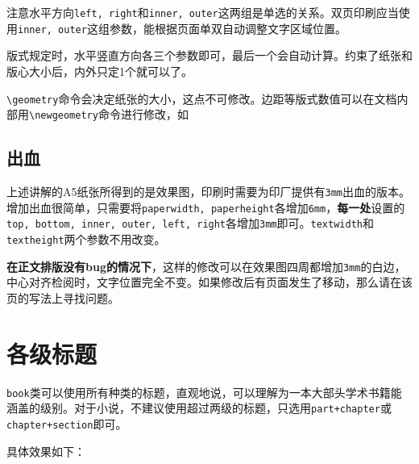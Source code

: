 \documentclass[10pt,openany]{book}
\begin{document}
注意水平方向\texttt{left,\ right}和\texttt{inner,\ outer}这两组是单选的关系。双页印刷应当使用\texttt{inner,\ outer}这组参数，能根据页面单双自动调整文字区域位置。



版式规定时，水平竖直方向各三个参数即可，最后一个会自动计算。约束了纸张和版心大小后，内外只定1个就可以了。

\texttt{\textbackslash{}geometry}命令会决定纸张的大小，这点不可修改。边距等版式数值可以在文档内部用\texttt{\textbackslash{}newgeometry}命令进行修改，如



\subsection{出血}

上述讲解的A5纸张所得到的是效果图，印刷时需要为印厂提供有\texttt{3mm}出血的版本。增加出血很简单，只需要将\texttt{paperwidth,\ paperheight}各增加\texttt{6mm}，\textbf{每一处}设置的\texttt{top,\ bottom,\ inner,\ outer,\ left,\ right}各增加\texttt{3mm}即可。\texttt{textwidth}和\texttt{textheight}两个参数不用改变。

\textbf{在正文排版没有bug的情况下}，这样的修改可以在效果图四周都增加\texttt{3mm}的白边，中心对齐检阅时，文字位置完全不变。如果修改后有页面发生了移动，那么请在该页的写法上寻找问题。

\section{各级标题}

\texttt{book}类可以使用所有种类的标题，直观地说，可以理解为一本大部头学术书籍能涵盖的级别。对于小说，不建议使用超过两级的标题，只选用\texttt{part+chapter}或\texttt{chapter+section}即可。

具体效果如下：
\end{document}
